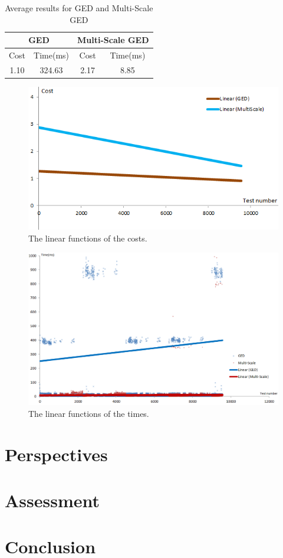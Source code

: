 \documentclass[UTF8, twoside]{EPURapport}
\begin{document}
\begin{table}[!h]
\centering
\setlength{\extrarowheight}{1.5pt}
\begin{tabular}{|c|c|c|c|} 
\hline
\multicolumn{2}{|c|}{GED} &  \multicolumn{2}{c|}{Multi-Scale GED}\\
\hline
Cost & Time(ms) & Cost & Time(ms)\\
\hline
1.10 & 324.63 & 2.17 & 8.85\\
\hline
\end{tabular}
\caption{\label{tab:Heuristics}Average results for GED and Multi-Scale GED}
\end{table}

\begin{figure} [h]
	\centering \includegraphics{images/GEDvsMultiScalePlot.png}
	\caption {The linear functions of the costs.}	
	\label {costplot}
\end{figure}

\begin{figure} [h]
	\centering \includegraphics[width=18cm]{images/GEDvsMultiScaleTimePlot.png}
	\caption {The linear functions of the times.}	
	\label {timeplot}
\end{figure}

\chapter{Perspectives}

\chapter{Assessment}

\chapter{Conclusion}
	
\end{document}
